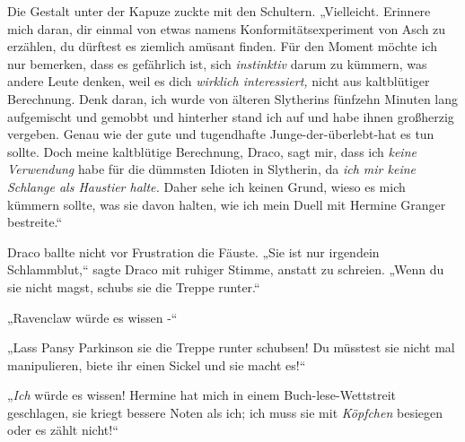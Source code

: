 Die Gestalt unter der Kapuze zuckte mit den Schultern. „Vielleicht. Erinnere mich daran, dir einmal von etwas namens Konformitätsexperiment von Asch zu erzählen, du dürftest es ziemlich amüsant finden. Für den Moment möchte ich nur bemerken, dass es gefährlich ist, sich \emph{instinktiv} darum zu kümmern, was andere Leute denken, weil es dich \emph{wirklich interessiert,} nicht aus kaltblütiger Berechnung. Denk daran, ich wurde von älteren Slytherins fünfzehn Minuten lang aufgemischt und gemobbt und hinterher stand ich auf und habe ihnen großherzig vergeben. Genau wie der gute und tugendhafte Junge-der-überlebt-hat es tun sollte. Doch meine kaltblütige Berechnung, Draco, sagt mir, dass ich \emph{keine Verwendung} habe für die dümmsten Idioten in Slytherin, da \emph{ich mir keine Schlange als Haustier halte.} Daher sehe ich keinen Grund, wieso es mich kümmern sollte, was sie davon halten, wie ich mein Duell mit Hermine Granger bestreite.“

Draco ballte nicht vor Frustration die Fäuste. „Sie ist nur irgendein Schlammblut,“ sagte Draco mit ruhiger Stimme, anstatt zu schreien. „Wenn du sie nicht magst, schubs sie die Treppe runter.“

„Ravenclaw würde es wissen -“

„Lass Pansy Parkinson sie die Treppe runter schubsen! Du müsstest sie nicht mal manipulieren, biete ihr einen Sickel und sie macht es!“

„\emph{Ich} würde es wissen! Hermine hat mich in einem Buch-lese-Wettstreit geschlagen, sie kriegt bessere Noten als ich; ich muss sie mit \emph{Köpfchen} besiegen oder es zählt nicht!“

